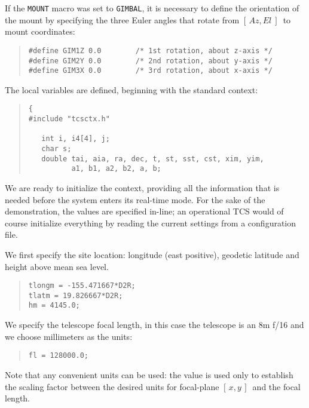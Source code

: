\documentclass[12pt,fleqn,twoside]{article}
\renewcommand{\_}{{\tt\char'137}}     %
\newcommand{\azel}      {$[\,Az,El~]$}
\newcommand{\xy}        {$[\,x,y\,]$}
\begin{document}
If the {\tt MOUNT} macro was set to {\tt GIMBAL}, it is necessary to
define the orientation of the mount by specifying the three
Euler angles that rotate from \azel\ to mount coordinates:
\begin{quote}
\begin{small}
\begin{verbatim}
#define GIM1Z 0.0        /* 1st rotation, about z-axis */
#define GIM2Y 0.0        /* 2nd rotation, about y-axis */
#define GIM3X 0.0        /* 3rd rotation, about x-axis */
\end{verbatim}\end{small}
\end{quote}
The local variables are defined, beginning with
the standard context:
\begin{quote}
\begin{small}
\begin{verbatim}
{
#include "tcsctx.h"

   int i, i4[4], j;
   char s;
   double tai, aia, ra, dec, t, st, sst, cst, xim, yim,
          a1, b1, a2, b2, a, b;
\end{verbatim}\end{small}
\end{quote}
We are ready to initialize the context, providing all the
information that is needed before the
system enters its real-time mode.  For the sake of the demonstration,
the values are specified in-line;  an operational TCS would of course
initialize everything by reading the current settings from
a configuration file.

We first specify
the site location: longitude (east positive),
geodetic latitude and height above mean sea level.
\begin{quote}
\begin{small}
\begin{verbatim}
tlongm = -155.471667*D2R;
tlatm = 19.826667*D2R;
hm = 4145.0;
\end{verbatim}\end{small}
\end{quote}
We specify the telescope focal length,
in this case the telescope is an 8m f/16 and we choose
millimeters as the units:
\begin{quote}
\begin{small}
\begin{verbatim}
fl = 128000.0;
\end{verbatim}\end{small}
\end{quote}
Note that any convenient units can be used:  the value is
used only to establish the scaling factor between
the desired units for focal-plane \xy\ and the focal length.
\end{document}
